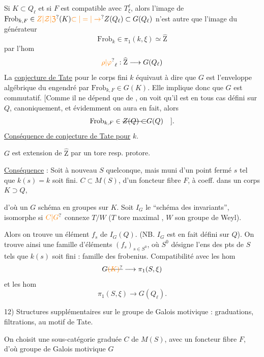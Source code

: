 Si $K\subset Q_\ell$ et si $F$ est compatible avec $T^\ell_\xi$, alors l'image de $\mathrm{Frob}_{k,F}\in \unsure{Z|\mathcal Z|\mathfrak Z}(K)\unsure{\subset|=|\to}Z(Q_\ell)\subset G(Q_\ell)$  n'est autre que l'image du  générateur
\[
\mathrm{Frob}_k\in\pi_1(k,\xi)\simeq\widehat{\mathrm Z}
\]
par l'hom
\[
\unsure{\rho|\varphi}_\ell:\widehat{\mathrm Z}\longrightarrow G(Q_\ell)
\]
La \uline{conjecture de Tate} pour le corps fini $k$ équivaut à dire que $G$ est l'enveloppe algébrique du  engendré par $\mathrm{Frob}_{k,F}\in G(K)$. Elle implique donc que $G$ est commutatif. [Comme il ne dépend que de , on voit qu'il est en tous cas défini sur $Q$, canoniquement, et évidemment on aura en fait, alors
\[
\mathrm{Frob}_{k,F}\in\deleted{Z(Q)\subset}G(Q)\quad ].
\]
\uline{Conséquence de conjecture de Tate pour} $k$.

$G$ est extension  de $\widehat{\mathrm Z}$ par un tore resp. protore.

\uline{Conséquence} : Soit à nouveau $S$ quelconque, mais muni d'un point fermé $s$ tel que $k(s)=k$ soit fini.  $C\subset M(S)$,  d'un foncteur fibre $F$, à coeff. dans un corps $K\supset Q$,

d'où un $G$ schéma en groupes sur $K$. Soit $I_G$ le ``schéma des invariants'', isomorphe si $\unsure{C|G}$ connexe  $T/W$ ($T$ tore maximal , $W$ son groupe de Weyl).

Alors on trouve un élément $f_s$ de $I_G(Q)$. (NB. $I_G$ est en fait défini sur $Q$). On trouve ainsi une famille d'éléments $(f_s)_{s\in S^0}$, où $S^0$ désigne l'ens des pts de $S$ tels que $k(s)$ soit fini : famille des frobenius. Compatibilité avec les hom
\[
G\deleted{\unsure{(K)}}\longrightarrow\pi_1(S,\xi)
\]
et les hom
\[
\pi_1(S,\xi)\longrightarrow G(Q_\ell).
\]

12) Structures supplémentaires sur le groupe de Galois motivique :  graduations, filtrations, au motif de Tate.

 On choisit une sous-\inserted{$\otimes$-}catégorie graduée $C$ de $M(S)$, avec un foncteur fibre $F$, d'où groupe de Galois motivique $G$

